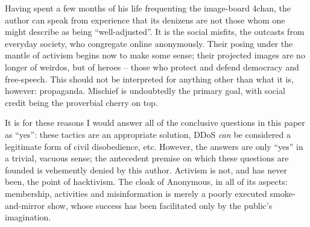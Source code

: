 \documentclass{article}
\begin{document}
Having spent a few months of his life frequenting the image-board 4chan, the author can speak from experience that its
denizens are not those whom one might describe as being ``well-adjusted''. It is the social misfits, the outcasts from
everyday society, who congregate online anonymously. Their posing under the mantle of activism begins now to make some
sense; their projected images are no longer of weirdos, but of heroes -- those who protect and defend democracy and
free-speech. This should not be interpreted for anything other than what it is, however: propaganda. Mischief is
undoubtedly the primary goal, with social credit being the proverbial cherry on top.

It is for these reasons I would answer all of the conclusive questions in this paper as ``yes'': these tactics are an
appropriate solution, DDoS \textit{can} be considered a legitimate form of civil disobedience, etc. However, the answers
are only ``yes'' in a trivial, vacuous sense; the antecedent premise on which these questions are founded is vehemently
denied by this author. Activism is not, and has never been, the point of hacktivism. The cloak of Anonymous, in all of
its aspects: membership, activities and misinformation is merely a poorly executed smoke-and-mirror show, whose success
has been facilitated only by the public's imagination.
\end{document}
